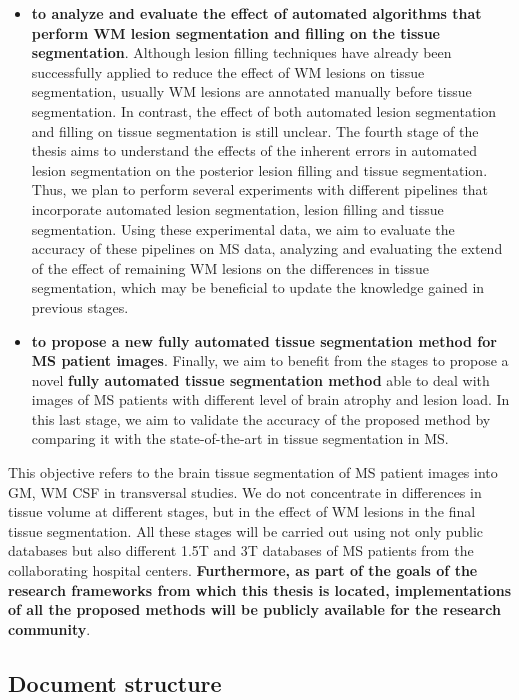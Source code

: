 \begin{itemize}
\item \textbf{to analyze and evaluate the effect of automated algorithms that perform WM lesion segmentation and filling on the tissue segmentation}. Although lesion filling techniques have already been successfully applied to reduce the effect of WM lesions on tissue segmentation, usually WM lesions are annotated manually before tissue segmentation. In contrast, the effect of both automated lesion segmentation and filling on tissue segmentation is still unclear. The fourth stage of the thesis aims to understand the effects of the inherent errors in automated lesion segmentation on the posterior lesion filling and tissue segmentation. Thus, we plan to perform several experiments with different pipelines that incorporate automated lesion segmentation, lesion filling and tissue segmentation. Using these experimental data, we aim to evaluate the accuracy of these pipelines on MS data, analyzing and evaluating the extend of the effect of remaining WM lesions on the differences in tissue segmentation, which may be beneficial to update the knowledge gained in previous stages. 

\item \textbf{to propose a new fully automated tissue segmentation method for MS patient images}. Finally, we aim to benefit from the stages to propose a novel \textbf{fully automated tissue segmentation method} able to deal with images of MS patients with different level of brain atrophy and lesion load. In this last stage, we aim to validate the accuracy of the proposed method by comparing it with the state-of-the-art in tissue segmentation in MS. 

\end{itemize}

\noindent This objective refers to the brain tissue segmentation of MS patient images into GM, WM CSF in transversal studies. We do not concentrate in differences in tissue volume at different stages, but in the effect of WM lesions in the final tissue segmentation. All these stages will be carried out using not only public databases but also different 1.5T and 3T databases of MS patients from the collaborating hospital centers. \textbf{Furthermore, as part of the goals of the research frameworks from which this thesis is located, implementations of all the proposed methods will be publicly available for the research community}.

\subsection{Document structure}
\label{sec:label}

